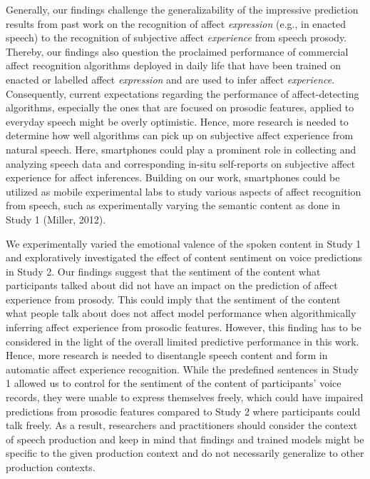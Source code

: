 \documentclass[
  english,
  man,floatsintext]{apa6}
\begin{document}
Generally, our findings challenge the generalizability of the impressive prediction results from past work on the recognition of affect \emph{expression} (e.g., in enacted speech) to the recognition of subjective affect \emph{experience} from speech prosody. Thereby, our findings also question the proclaimed performance of commercial affect recognition algorithms deployed in daily life that have been trained on enacted or labelled affect \emph{expression} and are used to infer affect \emph{experience}. Consequently, current expectations regarding the performance of affect-detecting algorithms, especially the ones that are focused on prosodic features, applied to everyday speech might be overly optimistic. Hence, more research is needed to determine how well algorithms can pick up on subjective affect experience from natural speech. Here, smartphones could play a prominent role in collecting and analyzing speech data and corresponding in-situ self-reports on subjective affect experience for affect inferences. Building on our work, smartphones could be utilized as mobile experimental labs to study various aspects of affect recognition from speech, such as experimentally varying the semantic content as done in Study 1 (Miller, 2012).

We experimentally varied the emotional valence of the spoken content in Study 1 and exploratively investigated the effect of content sentiment on voice predictions in Study 2. Our findings suggest that the sentiment of the content what participants talked about did not have an impact on the prediction of affect experience from prosody. This could imply that the sentiment of the content what people talk about does not affect model performance when algorithmically inferring affect experience from prosodic features. However, this finding has to be considered in the light of the overall limited predictive performance in this work. Hence, more research is needed to disentangle speech content and form in automatic affect experience recognition.
While the predefined sentences in Study 1 allowed us to control for the sentiment of the content of participants' voice records, they were unable to express themselves freely, which could have impaired predictions from prosodic features compared to Study 2 where participants could talk freely. As a result, researchers and practitioners should consider the context of speech production and keep in mind that findings and trained models might be specific to the given production context and do not necessarily generalize to other production contexts.
\end{document}
